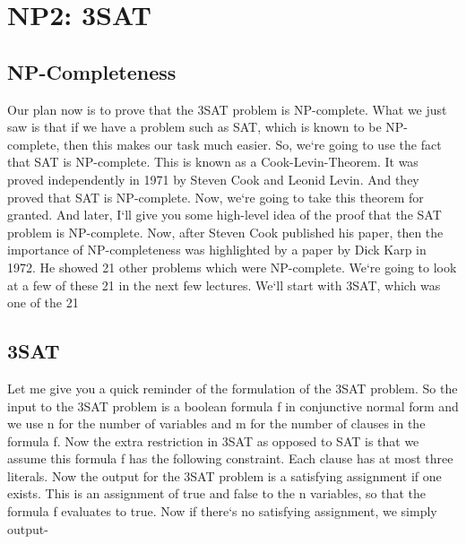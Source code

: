 \section{NP2: 3SAT}

\subsection{NP-Completeness}
Our plan now is to prove that the 3SAT problem is NP-complete.
What we just saw is that if we have a problem such as SAT, which is known to be NP-complete, then this makes our task much easier.
So, we`re going to use the fact that SAT is NP-complete.
This is known as a Cook-Levin-Theorem.
It was proved independently in 1971 by Steven Cook and Leonid Levin.
And they proved that SAT is NP-complete.
Now, we`re going to take this theorem for granted.
And later, I`ll give you some high-level idea of the proof that the SAT problem is NP-complete.
Now, after Steven Cook published his paper, then the importance of NP-completeness was highlighted by a paper by Dick Karp in 1972.
He showed 21 other problems which were NP-complete.
We`re going to look at a few of these 21 in the next few lectures.
We`ll start with 3SAT, which was one of the 21

\subsection{3SAT}
Let me give you a quick reminder of the formulation of the 3SAT problem.
So the input to the 3SAT problem is a boolean formula f in conjunctive normal form and we use n for the number of variables and m for the number of clauses in the formula f.
Now the extra restriction in 3SAT as opposed to SAT is that we assume this formula f has the following constraint.
Each clause has at most three literals.
Now the output for the 3SAT problem is a satisfying assignment if one exists.
This is an assignment of true and false to the n variables, so that the formula f evaluates to true.
Now if there`s no satisfying assignment, we simply output-

